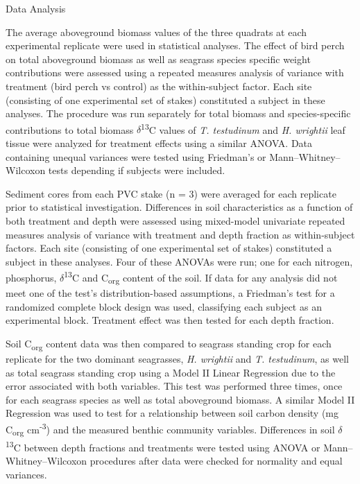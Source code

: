 \bigskip
\noindent Data Analysis
\medskip

	The average aboveground biomass values of the three quadrats at each experimental replicate were used in statistical analyses. The effect of bird perch on total aboveground biomass as well as seagrass species specific weight contributions were assessed using a repeated measures analysis of variance with treatment (bird perch vs control) as the within-subject factor. Each site (consisting of one experimental set of stakes) constituted a subject in these analyses. The procedure was run separately for total biomass and species-specific contributions to total biomass $\delta$\textsuperscript{13}C values of \textit{T. testudinum} and \textit{H. wrightii} leaf tissue were analyzed for treatment effects using a similar ANOVA. Data containing unequal variances were tested using Friedman’s or Mann–Whitney–Wilcoxon tests depending if subjects were included.

	Sediment cores from each PVC stake (n = 3) were averaged for each replicate prior to statistical investigation. Differences in soil characteristics as a function of both treatment and depth were assessed using mixed-model univariate repeated measures analysis of variance with treatment and depth fraction as within-subject factors. Each site (consisting of one experimental set of stakes) constituted a subject in these analyses. Four of these ANOVAs were run; one for each nitrogen, phosphorus, $\delta$\textsuperscript{13}C and C\textsubscript{org} content of the soil. If data for any analysis did not meet one of the test’s distribution-based assumptions, a Friedman's test for a randomized complete block design was used, classifying each subject as an experimental block. Treatment effect was then tested for each depth fraction.

	Soil C\textsubscript{org} content data was then compared to seagrass standing crop for each replicate for the two dominant seagrasses, \textit{H. wrightii} and \textit{T. testudinum}, as well as total seagrass standing crop using a Model II Linear Regression due to the error associated with both variables. This test was performed three times, once for each seagrass species as well as total aboveground biomass. A similar Model II Regression was used to test for a relationship between soil carbon density (mg C\textsubscript{org} cm\textsuperscript{-3}) and the measured benthic community variables. Differences in soil $\delta$\textsuperscript{13}C between depth fractions and treatments were tested using ANOVA or Mann–Whitney–Wilcoxon procedures after data were checked for normality and equal variances.


